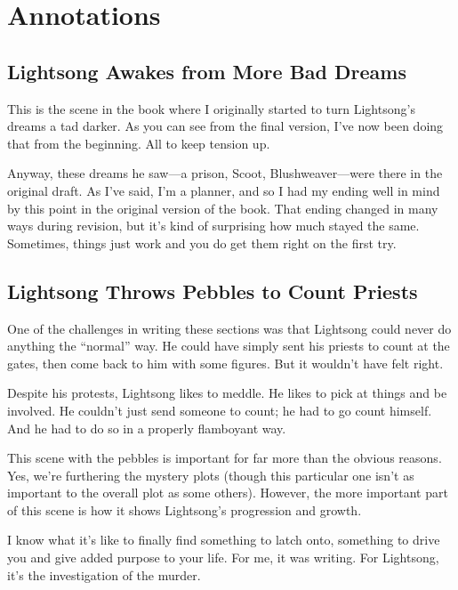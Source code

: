 \section*{Annotations}

\subsection*{Lightsong Awakes from More Bad Dreams}

This is the scene in the book where I originally started to turn Lightsong’s dreams a tad darker. As you can see from the final version, I’ve now been doing that from the beginning. All to keep tension up.

Anyway, these dreams he saw—a prison, Scoot, Blushweaver—were there in the original draft. As I’ve said, I’m a planner, and so I had my ending well in mind by this point in the original version of the book. That ending changed in many ways during revision, but it’s kind of surprising how much stayed the same. Sometimes, things just work and you do get them right on the first try.

\subsection*{Lightsong Throws Pebbles to Count Priests}

One of the challenges in writing these sections was that Lightsong could never do anything the “normal” way. He could have simply sent his priests to count at the gates, then come back to him with some figures. But it wouldn’t have felt right.

Despite his protests, Lightsong likes to meddle. He likes to pick at things and be involved. He couldn’t just send someone to count; he had to go count himself. And he had to do so in a properly flamboyant way.

This scene with the pebbles is important for far more than the obvious reasons. Yes, we’re furthering the mystery plots (though this particular one isn’t as important to the overall plot as some others). However, the more important part of this scene is how it shows Lightsong’s progression and growth.

I know what it’s like to finally find something to latch onto, something to drive you and give added purpose to your life. For me, it was writing. For Lightsong, it’s the investigation of the murder.

